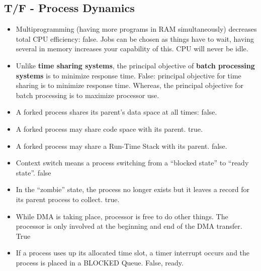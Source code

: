 \documentclass[fontsize=5pt]{scrartcl}
\begin{document}
\begin{multicols}{3}
    \subsection{T/F - Process Dynamics}
        \begin{itemize}
          \item Multiprogramming (having more programs in RAM simultaneously) decreases total CPU efficiency: false. Jobs can be chosen as things have to wait, having several
                in memory increases your capability of this. CPU will never be idle.
          \item Unlike \textbf{time sharing systems}, the principal objective of \textbf{batch processing systems} is to minimize response time. False: principal objective for time sharing is to 
                minimize response time. Whereas, the principal objective for batch processing is to maximize processor use.
          \item A forked process shares its parent's data space at all times: false.
          \item A forked process may share code space with its parent. true.
          \item A forked process may share a Run-Time Stack with its parent. false.
          \item Context switch means a process switching from a ``blocked state'' to ``ready state''. false
          \item In the ``zombie'' state, the process no longer exists but it leaves a record for its parent process to collect. true.
          \item While DMA is taking place, processor is free
                to do other things. The processor is only involved at the beginning
                and end of the DMA transfer. True
          \item If a process uses up its allocated time slot, a timer interrupt occurs
                and the process is placed in a BLOCKED Queue. False, ready.
          
                
          
        \end{itemize}
    

\end{multicols}
\end{document}
